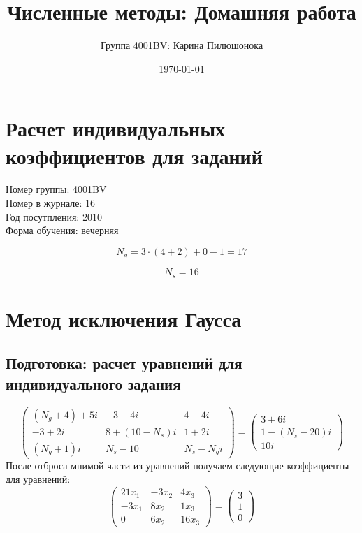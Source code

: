 \documentclass{article}
\title{Численные методы: Домашняя работа}
\author{Группа 4001BV: Карина Пилюшонока}
\date \today
\begin{document}
\maketitle
\newpage
\tableofcontents
\newpage
\section{Расчет индивидуальных коэффициентов для заданий}
Номер группы: 4001BV \\
Номер в журнале: 16 \\
Год посутпления: 2010 \\
Форма обучения: вечерняя

\begin{displaymath} 
  N_{g} = 3 \cdot (4 + 2) + 0 - 1 = 17
\end{displaymath}

\begin{displaymath}
  N_{s} = 16
\end{displaymath}
\section{Метод исключения Гаусса}
\subsection{Подготовка: расчет уравнений для индивидуального задания}
\begin{displaymath}
\left(
  \begin{array}{ccc}
    (N_{g}+4)+5i & -3-4i & 4-4i \\
    -3+2i & 8+(10-N_{s})i & 1+2i \\
    (N_{g}+1)i & N_{s}-10 & N_{s}-N_{g}i
  \end{array}
\right)
=
\left(
  \begin{array}{ccc}
    3+6i\\
    1-(N_{s}-20)i\\
    10i
  \end{array}
\right)
\end{displaymath}
После отброса мнимой части из уравнений получаем следующие коэффициенты для
уравнений:
\begin{displaymath}
\left(
  \begin{array}{ccc}
    21 x_{1} & -3 x_{2} & 4 x_{3} \\
    -3 x_{1} & 8 x_{2} & 1 x_{3} \\
    0 & 6 x_{2} & 16 x_{3}
  \end{array}
\right)
=
\left(
  \begin{array}{ccc}
    3\\
    1\\
    0
  \end{array}
\right)
\end{displaymath}
\end{document}
